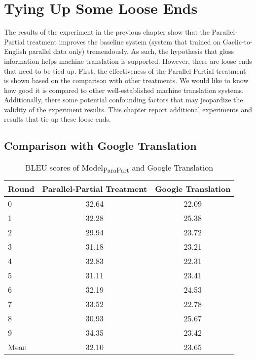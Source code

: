 \chapter{Tying Up Some Loose Ends}
\label{chap:Tying_Up}

The results of the experiment in the previous chapter show that the Parallel-Partial treatment improves the baseline system (system that trained on Gaelic-to-English parallel data only) tremendously. As such, the hypothesis that gloss information helps machine translation is supported. 
However, there are loose ends that need to be tied up. First, the effectiveness of the Parallel-Partial treatment is shown based on the comparison with other treatments. We would like to know how good it is compared to other well-established machine translation systems.       
Additionally, there some potential confounding factors that may jeopardize the validity of the experiment results. 
This chapter report additional experiments and results that tie up these loose ends.  

\section{Comparison with Google Translation}


\begin{table}[ht]
\centering
\begin{tabular}{lcc}
  \hline
Round & Parallel-Partial Treatment & Google Translation \\ 
  \hline
0 & 32.64 & 22.09 \\ 
  1 & 32.28 & 25.38 \\ 
  2 & 29.94 & 23.72 \\ 
  3 & 31.18 & 23.21 \\ 
  4 & 32.83 & 22.31 \\ 
  5 & 31.11 & 23.41 \\ 
  6 & 32.19 & 24.53 \\ 
  7 & 33.52 & 22.78 \\ 
  8 & 30.93 & 25.67 \\ 
  9 & 34.35 & 23.42 \\ 
   \hline
Mean & 32.10 & 23.65 \\ 
   \hline
\end{tabular}
\caption{BLEU scores of Model\textsubscript{ParaPart} and Google Translation} 
\label{Table:google}
\end{table}
